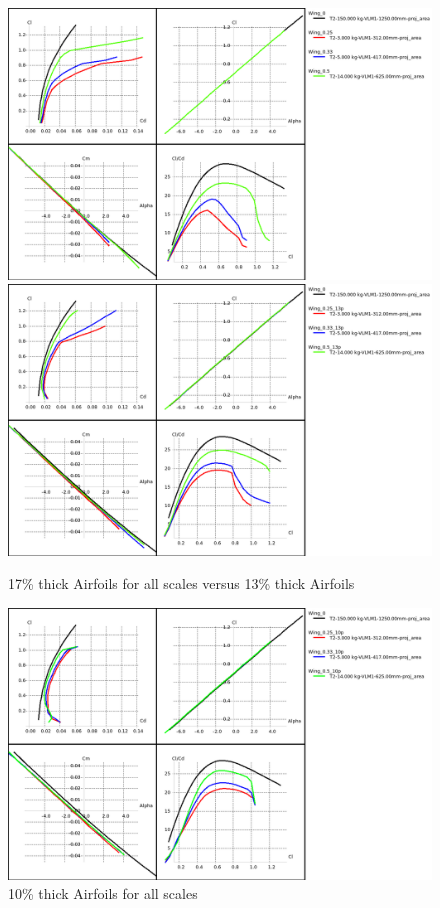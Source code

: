 \documentclass[titlepage,10pt]{article}
\begin{document}
\begin{figure}[h]
\begin{center}
\includegraphics[width=120mm]{scale_original_airfoil_17.png}
\includegraphics[width=120mm]{scale_tc_13.png}
\caption{17\% thick Airfoils for all scales versus 13\% thick Airfoils}
\label{fig:tc17}
\end{center}
\end{figure}

\begin{figure}[h]
\begin{center}
\includegraphics[width=120mm]{scale_tc_10.png}
\caption{10\% thick Airfoils for all scales}
\label{fig:tc10}
\end{center}
\end{figure}
\end{document}
